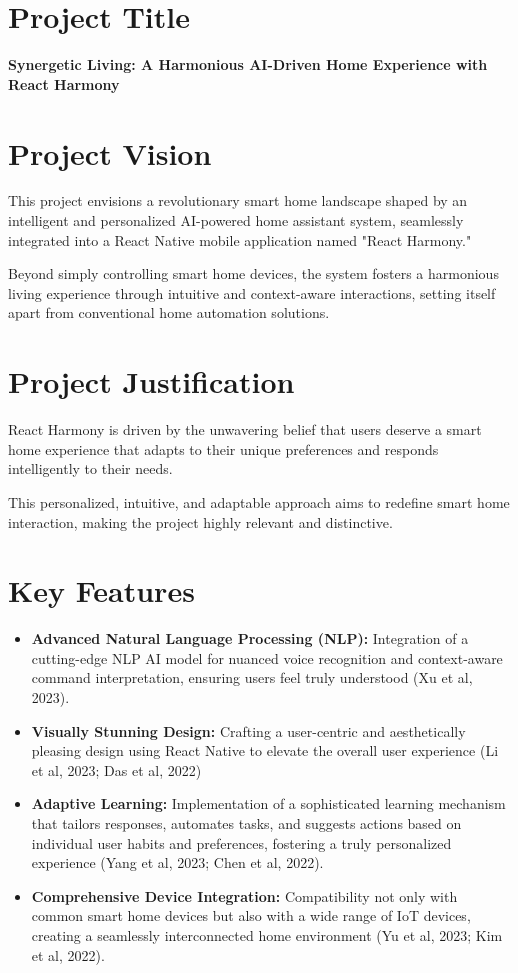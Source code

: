 \documentclass[12pt]{article}
\begin{document}
\section*{Project Title}
\textbf{Synergetic Living: A Harmonious AI-Driven Home Experience with React Harmony}

\section*{Project Vision}
This project envisions a revolutionary smart home landscape shaped by an intelligent and personalized AI-powered home assistant system, seamlessly integrated into a React Native mobile application named "React Harmony."

Beyond simply controlling smart home devices, the system fosters a harmonious living experience through intuitive and context-aware interactions, setting itself apart from conventional home automation solutions.

\section*{Project Justification}
React Harmony is driven by the unwavering belief that users deserve a smart home experience that adapts to their unique preferences and responds intelligently to their needs.

This personalized, intuitive, and adaptable approach aims to redefine smart home interaction, making the project highly relevant and distinctive.

\section*{Key Features}
\begin{itemize}
  \item \textbf{Advanced Natural Language Processing (NLP):} Integration of a cutting-edge NLP AI model for nuanced voice recognition and context-aware command interpretation, ensuring users feel truly understood (Xu et al, 2023).
  
  \item \textbf{Visually Stunning Design:} Crafting a user-centric and aesthetically pleasing design using React Native to elevate the overall user experience (Li et al, 2023; Das et al, 2022)
  \item \textbf{Adaptive Learning:} Implementation of a sophisticated learning mechanism that tailors responses, automates tasks, and suggests actions based on individual user habits and preferences, fostering a truly personalized experience (Yang et al, 2023; Chen et al, 2022).

    \item \textbf{Comprehensive Device Integration:} Compatibility not only with common smart home devices but also with a wide range of IoT devices, creating a seamlessly interconnected home environment (Yu et al, 2023; Kim et al, 2022).

\end{itemize}
\end{document}

